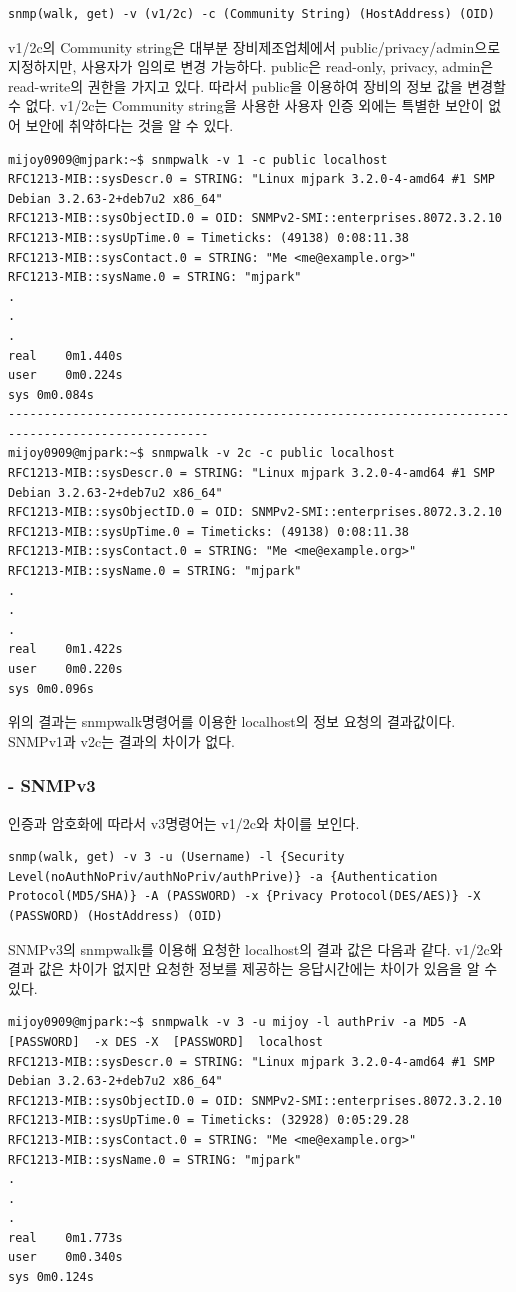 \documentclass[11pt
  , a4paper
  , article
  , oneside
]{memoir}
\begin{document}
\begin{lstlisting}[style=termstyle]
snmp(walk, get) -v (v1/2c) -c (Community String) (HostAddress) (OID) 
\end{lstlisting}

v1/2c의 Community string은 대부분 장비제조업체에서 public/privacy/admin으로 지정하지만, 사용자가 임의로 변경 가능하다. public은 read-only, privacy, admin은 read-write의 권한을 가지고 있다. 따라서 public을 이용하여 장비의 정보 값을 변경할 수 없다. v1/2c는 Community string을 사용한 사용자 인증 외에는 특별한 보안이 없어 보안에 취약하다는 것을 알 수 있다. 
\begin{lstlisting}[style=termstyle]
mijoy0909@mjpark:~$ snmpwalk -v 1 -c public localhost
RFC1213-MIB::sysDescr.0 = STRING: "Linux mjpark 3.2.0-4-amd64 #1 SMP Debian 3.2.63-2+deb7u2 x86_64"
RFC1213-MIB::sysObjectID.0 = OID: SNMPv2-SMI::enterprises.8072.3.2.10
RFC1213-MIB::sysUpTime.0 = Timeticks: (49138) 0:08:11.38
RFC1213-MIB::sysContact.0 = STRING: "Me <me@example.org>"
RFC1213-MIB::sysName.0 = STRING: "mjpark"
.
.
.
real	0m1.440s
user	0m0.224s
sys	0m0.084s
--------------------------------------------------------------------------------------------------
mijoy0909@mjpark:~$ snmpwalk -v 2c -c public localhost
RFC1213-MIB::sysDescr.0 = STRING: "Linux mjpark 3.2.0-4-amd64 #1 SMP Debian 3.2.63-2+deb7u2 x86_64"
RFC1213-MIB::sysObjectID.0 = OID: SNMPv2-SMI::enterprises.8072.3.2.10
RFC1213-MIB::sysUpTime.0 = Timeticks: (49138) 0:08:11.38
RFC1213-MIB::sysContact.0 = STRING: "Me <me@example.org>"
RFC1213-MIB::sysName.0 = STRING: "mjpark"
.
.
.
real	0m1.422s
user	0m0.220s
sys	0m0.096s
\end{lstlisting}

위의 결과는 snmpwalk명령어를 이용한 localhost의 정보 요청의 결과값이다. SNMPv1과 v2c는 결과의 차이가 없다.
\\
\subsubsection{- SNMPv3}
인증과 암호화에 따라서 v3명령어는 v1/2c와 차이를 보인다.
\begin{lstlisting}[style=termstyle]
snmp(walk, get) -v 3 -u (Username) -l {Security Level(noAuthNoPriv/authNoPriv/authPrive)} -a {Authentication Protocol(MD5/SHA)} -A (PASSWORD) -x {Privacy Protocol(DES/AES)} -X (PASSWORD) (HostAddress) (OID) 
\end{lstlisting}

SNMPv3의 snmpwalk를 이용해 요청한 localhost의 결과 값은 다음과 같다. v1/2c와 결과 값은 차이가 없지만 요청한 정보를 제공하는 응답시간에는 차이가 있음을 알 수 있다.
\begin{lstlisting}[style=termstyle]
mijoy0909@mjpark:~$ snmpwalk -v 3 -u mijoy -l authPriv -a MD5 -A  [PASSWORD]  -x DES -X  [PASSWORD]  localhost
RFC1213-MIB::sysDescr.0 = STRING: "Linux mjpark 3.2.0-4-amd64 #1 SMP Debian 3.2.63-2+deb7u2 x86_64"
RFC1213-MIB::sysObjectID.0 = OID: SNMPv2-SMI::enterprises.8072.3.2.10
RFC1213-MIB::sysUpTime.0 = Timeticks: (32928) 0:05:29.28
RFC1213-MIB::sysContact.0 = STRING: "Me <me@example.org>"
RFC1213-MIB::sysName.0 = STRING: "mjpark"
.
.
.
real	0m1.773s
user	0m0.340s
sys	0m0.124s
\end{lstlisting}
\end{document}
